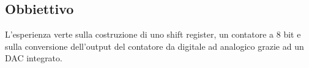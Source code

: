 \subsection{Obbiettivo}

L'esperienza verte sulla costruzione di uno shift register, un contatore a 8 bit
e sulla conversione dell'output del contatore da digitale ad analogico grazie ad
un DAC integrato.

